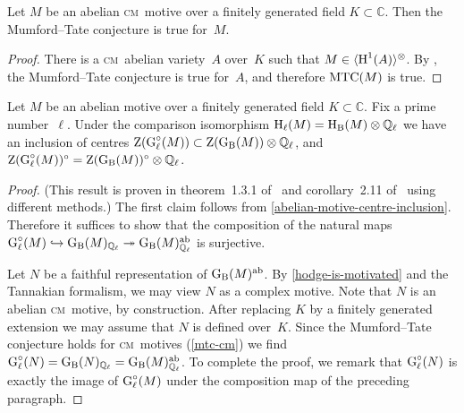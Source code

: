 \documentclass[10pt,twoside,leqno]{article}
\numberwithin{equation}{subsection}
\newcommand{\into}{\hookrightarrow}
\newcommand{\onto}{\twoheadrightarrow}
\newcommand{\QQ}{\mathbb{Q}}
\newcommand{\QQl}{\QQ_{\ell}}
\newcommand{\CC}{\mathbb{C}}
\newcommand{\ab}{\textnormal{ab}}
\newcommand{\HH}{\textnormal{H}}
\newcommand{\Hl}{\HH_{\ell}}
\newcommand{\HB}{\HH_{\textnormal{B}}}
\newcommand{\Zentrum}{\textnormal{Z}}
\newcommand{\GG}{\textnormal{G}}
\newcommand{\GB}{\GG_{\textnormal{B}}}
\newcommand{\Gl}{\GG_{\ell}}
\newcommand{\Glc}{\Gl^{\circ}}
\newcommand{\Tangen}[1]{\langle #1 \rangle^{\otimes}}
\newcommand{\cm}{\textsc{cm}}
\newcommand{\MTC}{\textnormal{MTC}}
\begin{document}
\begin{lemma} %
 \label{mtc-cm}
 Let $M$ be an abelian \cm~motive
 over a finitely generated field $K \subset \CC$.
 Then the Mumford--Tate conjecture is true for~$M$.
 \begin{proof}
  There is a \cm~abelian variety~$A$ over~$K$
  such that $M \in \Tangen{\HH^1(A)}$.
  By \cite{Pohl68}, the Mumford--Tate conjecture is true for~$A$,
  and therefore $\MTC(M)$ is true.
 \end{proof}
\end{lemma}

\begin{lemma} %
 \label{centre-mtc-abelian-motive}
 Let $M$ be an abelian motive over
 a finitely generated field $K \subset \CC$.
 Fix a prime number~$\ell$.
 Under the comparison isomorphism $\Hl(M) = \HB(M) \otimes \QQl$
 we have an inclusion of centres
 $\Zentrum(\Glc(M)) \subset \Zentrum(\GB(M)) \otimes \QQl$, and
 $\Zentrum(\Glc(M))^\circ = \Zentrum(\GB(M))^\circ \otimes \QQl$.
 \begin{proof}
  (This result is proven in theorem~1.3.1 of~\cite{Va08}
  and corollary~2.11 of~\cite{UY13} using different methods.)
  The first claim follows from \cref{abelian-motive-centre-inclusion}.
  Therefore it suffices to show that the composition
  of the natural maps
  $\Glc(M) \into \GB(M)_{\QQl} \onto \GB(M)^\ab_{\QQl}$
  is surjective.

  Let $N$ be a faithful representation of $\GB(M)^\ab$.
  By \cref{hodge-is-motivated} and the Tannakian formalism,
  we may view $N$ as a complex motive.
  Note that $N$ is an abelian \cm~motive, by construction.
  After replacing $K$ by a finitely generated extension
  we may assume that $N$ is defined over~$K$.
  Since the Mumford--Tate conjecture holds for \cm~motives (\cref{mtc-cm})
  we find $\Glc(N) = \GB(N)_{\QQl} = \GB(M)^\ab_{\QQl}$.
  To complete the proof,
  we remark that $\Glc(N)$ is exactly the image of $\Glc(M)$
  under the composition map of the preceding paragraph.
 \end{proof}
\end{lemma}
\end{document}

